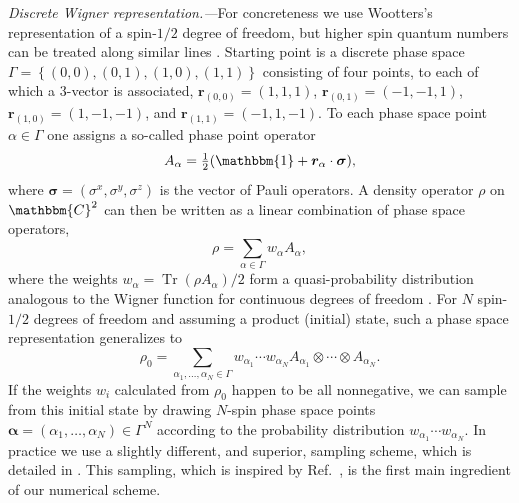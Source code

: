 \documentclass[aps,prl,showpacs,amsmath,amssymb,superscriptaddress,reprint,10pt]{revtex4-1}
\newcommand{\ar}[1]{{\color{analabha} #1}}
\newcommand\CC{{\mathbbm{C}}}
\newcommand\id{{\mathbbm{1}}}
\newcommand{\mvec}[1]{\boldsymbol #1}
\DeclareMathOperator{\Tr}{{Tr}}
\begin{document}
\begin{bibunit}
{\em Discrete Wigner representation.---}For concreteness we use Wootters's representation of a spin-$1/2$ degree of freedom, but higher spin quantum numbers can be treated along similar lines \cite{Wootters87}. Starting point is a discrete phase space $\Gamma=\left\{(0,0),(0,1),(1,0),(1,1)\right\}$ consisting of four points, %
to each of which a 3-vector is associated, $\mvec{r}_{(0,0)}=(1,1,1)$, $\mvec{r}_{(0,1)}=(-1,-1,1)$, $\mvec{r}_{(1,0)}=(1,-1,-1)$, and $\mvec{r}_{(1,1)}=(-1,1,-1)$. To each phase space point $\alpha\in\Gamma$ one assigns a so-called phase \ar{point} operator
\begin{equation}\label{e:Aalpha}
A_\alpha = \tfrac{1}{2}(\id+\mvec{r}_\alpha\cdot\mvec{\sigma}),
\end{equation}
where $\mvec{\sigma}=\left(\sigma^x,\sigma^y,\sigma^z\right)$ is the vector of Pauli operators. A density operator $\rho$ on $\CC^2$ can then be written  as a linear combination of phase space operators,
\begin{equation}
\rho=\sum_{\alpha\in\Gamma}w_\alpha A_\alpha,
\end{equation}
where the weights $w_\alpha=\Tr(\rho A_\alpha)/2$ form a quasi-probability distribution analogous to the Wigner function for continuous degrees of freedom \cite{Wootters87}. For $N$ spin-$1/2$ degrees of freedom and assuming a product (initial) state, such a phase space representation generalizes to
\begin{equation}
\rho_0=\sum_{\alpha_1,\dotsc,\alpha_N\in\Gamma}w_{\alpha_1}\cdots w_{\alpha_N}A_{\alpha_1}\otimes\cdots\otimes A_{\alpha_N}.
\end{equation}
If the weights $w_i$ calculated from $\rho_0$ happen to be all nonnegative, we can sample from this initial state by drawing $N$-spin phase space points $\mvec{\alpha}=(\alpha_1,\dotsc,\alpha_N)\in\Gamma^N$ according to the probability distribution $w_{\alpha_1}\cdots w_{\alpha_N}$. In practice we use a slightly different, and superior, sampling scheme, which is detailed in \cite{Note1}. This sampling, which is inspired by Ref.~\cite{Schachenmayer_etal15}, is the first main ingredient of our numerical scheme.


\end{bibunit}
\end{document}
